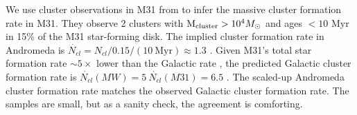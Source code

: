 
We use cluster observations in M31 from \citet{Vansevicius2009} to infer the
massive cluster formation rate in M31.  They observe 2 clusters with
${\rm M}_{\rm cluster}>10^4M_{\odot}$ and ages $<10$ Myr in 15\% of the M31 star-forming
disk.  The implied cluster formation rate in Andromeda is $\dot{N_{cl}} =
N_{cl}/0.15 / (10 ~\mathrm{Myr}) \approx 1.3$ \permyr.  Given M31's total star
formation rate $\sim 5\times$ lower than the Galactic rate \citep[Andromeda
$\mdot=0.4$, Milky Way $\mdot=2$ \msun \permyr;][]{Barmby2006,Chomiuk2011}, the
predicted Galactic cluster formation rate is $\dot{N_{cl}}(MW) = 5~
\dot{N_{cl}}(M31) = 6.5$ \permyr \citep[assuming the CFR scales linearly with
the SFR; ][]{Bastian2008}.  
The scaled-up Andromeda cluster formation rate matches the observed Galactic
cluster formation rate.  The samples are small, but as a sanity check, the
agreement is comforting.




